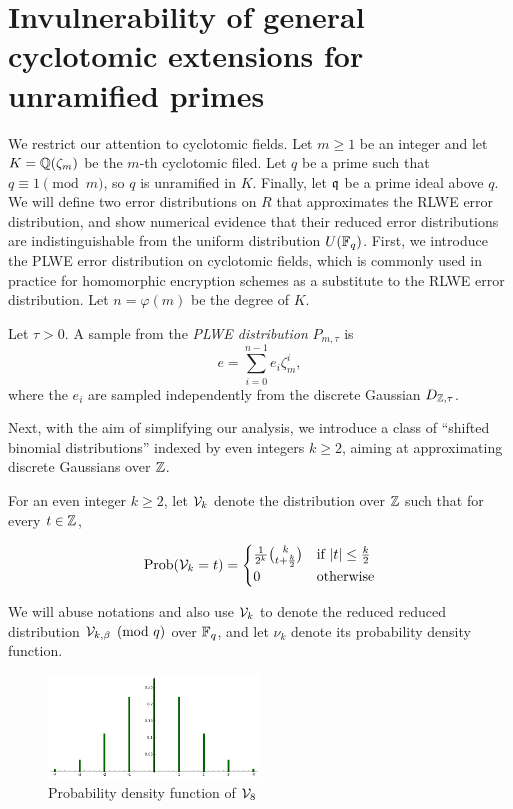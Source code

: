 \documentclass{amsart}
\begin{document}
\section{Invulnerability of general cyclotomic extensions for unramified primes}
\label{sec: cyclo-secure}

We restrict our attention to cyclotomic fields. Let $m \geq 1$ be an integer and let $K = \mathbb{Q}(\zeta_m)$ be the $m$-th cyclotomic filed. Let $q$ be a prime such that
$q \equiv 1\pmod{m}$, so $q$ is unramified in $K$. Finally, let $\mathfrak{q}$ be a prime ideal above $q$. We will define two error distributions on $R$ that approximates the RLWE error distribution, and show numerical evidence that their reduced error distributions are indistinguishable from the uniform distribution $U(\mathbb{F}_q)$. First, we introduce the PLWE error distribution on cyclotomic fields, which is commonly used in practice for homomorphic encryption schemes as a substitute to the RLWE error distribution. Let $n = \varphi(m)$ be the degree of $K$.
\begin{Definition}
Let $\tau > 0$. A sample from the {\it PLWE distribution} $P_{m,\tau}$ is
\[
    e = \sum_{i=0}^{n-1} e_i \zeta_m^i,
\]
where the $e_i$ are sampled independently from the discrete Gaussian $D_{\mathbb{Z},\tau}$.
\end{Definition}

Next, with the aim of simplifying our analysis, we introduce a class of ``shifted binomial distributions'' indexed by even integers $k \geq 2$, aiming at approximating discrete Gaussians over $\mathbb{Z}$.
\begin{Definition}
For an even integer $k \geq 2$, let $\mathcal{V}_{k}$ denote the distribution over $\mathbb{Z}$ such that for every $t \in \mathbb{Z}$,

$$\operatorname{Prob}(\mathcal{V}_{k} = t) =  \begin{cases} \frac{1}{2^k}{k \choose t+\frac{k}{2}} &\mbox{if } |t| \leq \frac{k}{2} \\
0 & \mbox{otherwise}  \end{cases}$$

\end{Definition}
We will abuse notations and also use $\mathcal{V}_{k}$ to denote the reduced reduced distribution $\mathcal{V}_{k,\beta} \pmod {q}$ over $\mathbb{F}_q$, and let $\nu_{k}$ denote its probability density function.

\begin{figure}[h!]
\centering
\includegraphics[width = 0.5\textwidth]{v8.png}
\caption{Probability density function of $\mathcal{V}_{8}$}
\end{figure}
\end{document}
